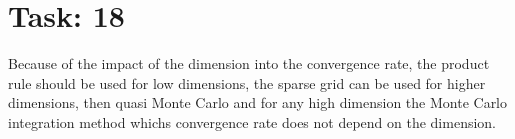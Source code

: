 \documentclass{article}
\begin{document}
\newpage

\section*{Task: 18}

Because of the impact of the dimension into the convergence rate, 
the product rule should be used for low dimensions, 
the sparse grid can be used for higher dimensions, then quasi Monte Carlo and
for any high dimension the Monte Carlo integration method whichs convergence rate does not depend on the dimension. 
\end{document}
